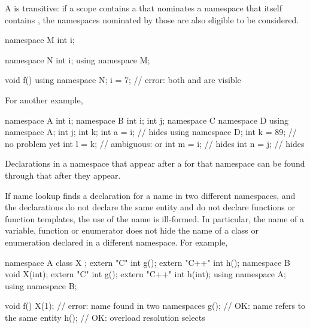 \pnum
\begin{note}
A  is transitive: if a scope contains a
 that nominates a namespace that itself
contains , the namespaces nominated by those
 are also eligible to be considered.
\end{note}
\begin{example}
\begin{codeblock}
namespace M {
  int i;
}

namespace N {
  int i;
  using namespace M;
}

void f() {
  using namespace N;
  i = 7;            // error: both  and  are visible
}
\end{codeblock}

For another example,
\begin{codeblock}
namespace A {
  int i;
}
namespace B {
  int i;
  int j;
  namespace C {
    namespace D {
      using namespace A;
      int j;
      int k;
      int a = i;    //  hides 
    }
    using namespace D;
    int k = 89;     // no problem yet
    int l = k;      // ambiguous:  or 
    int m = i;      //  hides 
    int n = j;      //  hides 
  }
}
\end{codeblock}
\end{example}


\pnum
\begin{note}
Declarations in a namespace
that appear after a  for that namespace
can be found through that  after they appear.
\end{note}

\pnum
\begin{note}
If name lookup finds a declaration for a name in two different
namespaces, and the declarations do not declare the same entity and do
not declare functions or function templates, the use of the name is ill-formed.
In particular, the name of a variable, function or enumerator does not
hide the name of a class or enumeration declared in a different
namespace. For example,
\begin{codeblock}
namespace A {
  class X { };
  extern "C"   int g();
  extern "C++" int h();
}
namespace B {
  void X(int);
  extern "C"   int g();
  extern "C++" int h(int);
}
using namespace A;
using namespace B;

void f() {
  X(1);             // error: name  found in two namespaces
  g();              // OK: name  refers to the same entity
  h();              // OK: overload resolution selects 
}
\end{codeblock}
\end{note}

